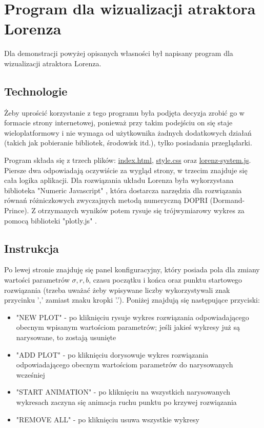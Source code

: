 \documentclass[12pt]{report}
\begin{document}
\chapter{Program dla wizualizacji atraktora Lorenza}
	\hspace{\parindent} Dla demonstracji powyżej opisanych własności był napisany program dla wizualizacji atraktora Lorenza.
	
	\section{Technologie}
	\hspace{\parindent} Żeby uprościć korzystanie z tego programu była podjęta decyzja zrobić go w formacie strony internetowej, ponieważ przy takim podejściu on się staje wieloplatformowy i nie wymaga od użytkownika żadnych dodatkowych działań (takich jak pobieranie bibliotek, środowisk itd.), tylko posiadania przeglądarki.
	
	\hspace{\parindent} Program składa się z trzech plików: \hyperref[sec:html]{index.html}, \hyperref[sec:css]{style.css} oraz \hyperref[sec:js]{lorenz-system.js}. Piersze dwa odpowiadają oczywiście za wygląd strony, w trzecim znajduje się cała logika aplikacji. Dla rozwiązania układu Lorenza była wykorzystana biblioteka "Numeric Javascript" \cite{NumJS}, która dostarcza narzędzia dla rozwiązania równań różniczkowych zwyczajnych metodą numeryczną DOPRI (Dormand-Prince). Z otrzymanych wyników potem rysuje się trójwymiarowy wykres za pomocą biblioteki "plotly.js" \cite{Ply}.
	
	\section{Instrukcja}
	\hspace{\parindent} Po lewej stronie znajduję się panel konfiguracyjny, który posiada pola dla zmiany wartości parametrów $\sigma, r, b$, czasu początku i końca oraz punktu startowego rozwiązania (trzeba uważać żeby wpisywane liczby wykorzystywali znak przycinku ',' zamiast znaku kropki '.'). Poniżej znajdują się następujące przyciski:
	\begin{itemize}
		\item "NEW PLOT" - po kliknięciu rysuje wykres rozwiązania odpowiadającego obecnym wpisanym wartościom parametrów; jeśli jakieś wykresy już są narysowane, to zostają usunięte
		\item "ADD PLOT" - po kliknięciu dorysowuje wykres rozwiązania odpowiadającego obecnym wartościom parametrów do narysowanych wcześniej
		\item "START ANIMATION" - po kliknięciu na wszystkich narysowanych wykresach zaczyna się animacja ruchu punktu po krzywej rozwiązania
		\item "REMOVE ALL" - po kliknięciu usuwa wszystkie wykresy
	\end{itemize}
\end{document}
